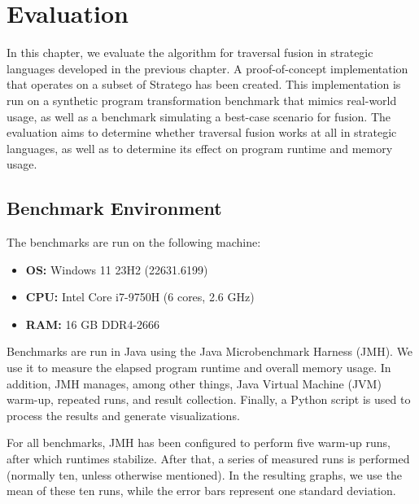 
\chapter{\label{chap:evaluation}Evaluation}

In this chapter, we evaluate the algorithm for traversal fusion in strategic languages developed in the previous chapter. A proof-of-concept implementation that operates on a subset of Stratego has been created. This implementation is run on a synthetic program transformation benchmark that mimics real-world usage, as well as a benchmark simulating a best-case scenario for fusion. The evaluation aims to determine whether traversal fusion works at all in strategic languages, as well as to determine its effect on program runtime and memory usage.

\section{Benchmark Environment}
The benchmarks are run on the following machine:
\begin{itemize}
    \item \textbf{OS:} Windows 11 23H2 (22631.6199)
    \item \textbf{CPU:} Intel Core i7-9750H (6 cores, 2.6 GHz)
    \item \textbf{RAM:} 16 GB DDR4-2666
\end{itemize}

Benchmarks are run in Java using the Java Microbenchmark Harness (JMH). We use it to measure the elapsed program runtime and overall memory usage. In addition, JMH manages, among other things, Java Virtual Machine (JVM) warm-up, repeated runs, and result collection. Finally, a Python script is used to process the results and generate visualizations.

For all benchmarks, JMH has been configured to perform five warm-up runs, after which runtimes stabilize. After that, a series of measured runs is performed (normally ten, unless otherwise mentioned). In the resulting graphs, we use the mean of these ten runs, while the error bars represent one standard deviation.

